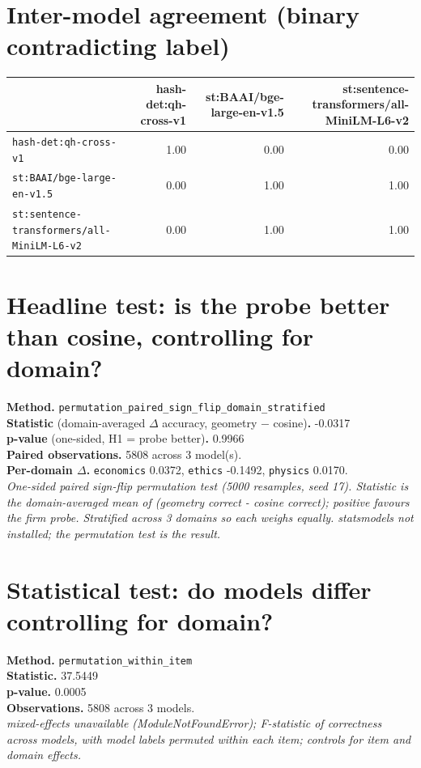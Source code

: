 \documentclass[11pt]{article}
\begin{document}
\section{Inter-model agreement (binary contradicting label)}
\begin{tabular}{l r r r}
\toprule
 & hash-det:qh-cross-v1 & st:BAAI/bge-large-en-v1.5 & st:sentence-transformers/all-MiniLM-L6-v2 \\
\midrule
\texttt{hash-det:qh-cross-v1} & 1.00 & 0.00 & 0.00 \\
\texttt{st:BAAI/bge-large-en-v1.5} & 0.00 & 1.00 & 1.00 \\
\texttt{st:sentence-transformers/all-MiniLM-L6-v2} & 0.00 & 1.00 & 1.00 \\
\bottomrule
\end{tabular}




\section{Headline test: is the probe better than cosine, controlling for domain?}
\textbf{Method.} \texttt{permutation\_paired\_sign\_flip\_domain\_stratified}\\
\textbf{Statistic} (domain-averaged $\Delta$ accuracy, geometry $-$ cosine)\textbf{.} -0.0317\\
\textbf{p-value} (one-sided, H1 = probe better)\textbf{.} 0.9966\\
\textbf{Paired observations.} 5808 across 3 model(s).\\
\textbf{Per-domain $\Delta$.} \texttt{economics} 0.0372, \texttt{ethics} -0.1492, \texttt{physics} 0.0170.\\
\textit{One-sided paired sign-flip permutation test (5000 resamples, seed 17). Statistic is the domain-averaged mean of (geometry correct - cosine correct); positive favours the firm probe. Stratified across 3 domains so each weighs equally. statsmodels not installed; the permutation test is the result.}

\section{Statistical test: do models differ controlling for domain?}
\textbf{Method.} \texttt{permutation\_within\_item}\\
\textbf{Statistic.} 37.5449\\
\textbf{p-value.} 0.0005\\
\textbf{Observations.} 5808 across 3 models.\\
\textit{mixed-effects unavailable (ModuleNotFoundError); F-statistic of correctness across models, with model labels permuted within each item; controls for item and domain effects.}
\end{document}
